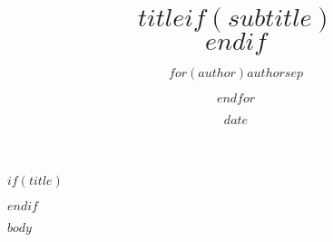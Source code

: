 \documentclass[$if(fontsize)$$fontsize$,$endif$$if(lang)$$lang$,$endif$$if(papersize)$$papersize$,$endif$$for(classoption)$$classoption$$sep$,$endfor$]{report}
\title{$title$$if(subtitle)$\\\vspace{0.5em}{\large $subtitle$}$endif$}
\author{$for(author)$$author$$sep$ \and $endfor$}
\date{$date$}
\begin{document}
$if(title)$
\maketitle
$endif$

$body$
\end{document}

